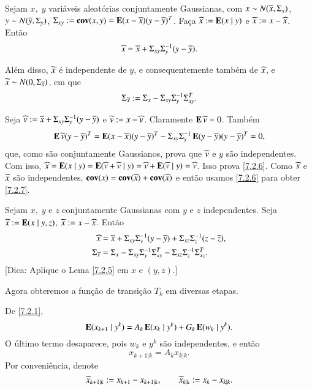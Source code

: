 \begin{Lema}\label{7.2.5}
Sejam $x,\;y$ variáveis aleatórias conjuntamente Gaussianas, com $x\sim N(\overline x, \Sigma_x)$, $y\sim N(\overline y, \Sigma_y)$,
$\Sigma_{xy}:=\operatorname{\bf cov}(x,y)=\operatorname{\bf E}(x-\overline x)(y-\overline y)^T$. Faça $\widehat x:=\operatorname{\bf E}(x\;|\;y)$ e $\widetilde x:=x-\widehat x$. Então 
\begin{equation}\label{7.2.6}
\widehat x = \overline x+\Sigma_{xy}\Sigma^{-1}_y(y-\overline y).
\end{equation}

Além disso, $\widetilde x$ é independente de $y$, e consequentemente também de $\widehat x$, e $\widetilde x\sim N(0,\Sigma_{\widetilde x})$, em que
\begin{equation}\label{7.2.7}
\Sigma_{\widetilde x} := \Sigma_x - \Sigma_{xy}\Sigma_y^{-1}\Sigma_{xy}^T.
\end{equation}
\end{Lema}
\begin{Dem}
Seja $\widehat v:=\overline x+\Sigma_{xy}\Sigma^{-1}_y(y-\overline y)$ e $\widetilde v:= x-\widehat v$. Claramente $\operatorname{\bf E}\widetilde v=0$. Também
\[
\operatorname{\bf E}\widetilde v(y-\overline y)^T = \operatorname{\bf E}(x-\overline x)(y-\overline y)^T-\Sigma_{xy}\Sigma^{-1}_y\operatorname{\bf E}(y-\overline y)(y-\overline y)^T=0,
\]
que, como são conjuntamente Gaussianos, prova que $\widetilde v$ e $y$ são independentes. Com isso, $\widehat x=\operatorname{\bf E}(x\;|\;y)=\operatorname{\bf E}(\widehat v+\widetilde v\;|\;y)=\widehat v+\operatorname{\bf E}(\widetilde v\;|\;y)=\widehat v$. Isso prova \eqref{7.2.6}.  Como $\widehat x$ e $\widetilde x$  são independentes, $\operatorname{\bf cov}(x)=\operatorname{\bf cov}(\widehat x)+\operatorname{\bf cov}(\widetilde x)$ e então usamos \eqref{7.2.6} para obter \eqref{7.2.7}.
\end{Dem}
\begin{Exercicio}\label{7.2.8}
Sejam $x,\;y$ e $z$ conjuntamente Gaussianas com $y$ e $z$ independentes. Seja $\widehat x:=\operatorname{\bf E}(x\;|\;y,z)$, $\widetilde x:=x-\widehat x$. Então
\[
\begin{aligned}
\widehat x &= \overline x + \Sigma_{xy}\Sigma_{y}^{-1}(y-\overline y) + \Sigma_{xz}\Sigma_{z}^{-1}(z-\overline z), \\
\Sigma_{\widetilde x} &= \Sigma_{x} - \Sigma_{xy}\Sigma_{y}^{-1}\Sigma_{xy}^T  - \Sigma_{xz}\Sigma_{z}^{-1}\Sigma_{xz}^T .
\end{aligned}
\]
\rm[Dica: Aplique o Lema \ref{7.2.5} em $x$ e $(y,z)$.]
\end{Exercicio}


Agora obteremos a função de transição $T_k$ em diversas etapas.


De \eqref{7.2.1}, 
\[
\operatorname{\bf E}(x_{k+1}\;|\;y^k)=A_k\operatorname{\bf E}(x_{k}\;|\;y^k) + G_k\operatorname{\bf E}(w_{k}\;|\;y^k).
\]
O  último termo desaparece, pois $w_k$ e $y^k$ são independentes, e então
\begin{equation}\label{7.2.9}
x_{k+1|k} = A_kx_{k|k}.
\end{equation}
Por conveniência, denote
\begin{equation}\label{7.2.10}
\widetilde x_{k+1|k}:=x_{k+1}-x_{k+1|k},\qquad
\widetilde x_{k|k} := x_{k} - x_{k|k}.
\end{equation}

